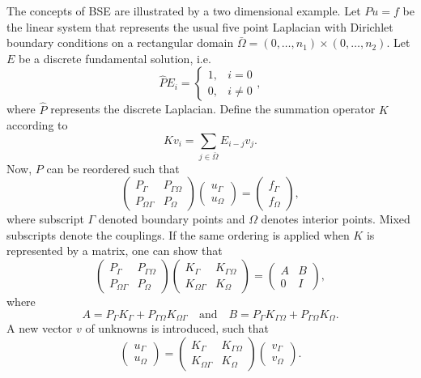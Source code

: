 \documentclass{report}
\begin{document}
The concepts of BSE are illustrated by a two dimensional example. Let
$Pu=f$ be the linear system that represents the usual five point
Laplacian with Dirichlet boundary conditions on a rectangular domain
$\bar{\Omega}=(0,\ldots,n_1)\times(0,\ldots,n_2)$. Let $E$ be a
discrete fundamental solution, i.e.
\[
\hat{P}E_i = \left\{ \begin{array}{ll}
1, &i=0\\
0, &i\ne 0 \end{array} \right. ,
\]
where $\hat{P}$ represents the discrete Laplacian. Define the
summation operator $K$ according to
\[
Kv_i=\sum_{j\in\bar{\Omega}}E_{i-j}v_j.
\]
Now, $P$ can be reordered such that
\begin{equation}
\label{eq:Puf}
\left( \begin{array}{cc} P_{\Gamma}&P_{\Gamma\Omega}\\
P_{\Omega\Gamma}&P_{\Omega} \end{array} \right)
\left( \begin{array}{c} u_{\Gamma}\\u_{\Omega} \end{array} \right)
=\left( \begin{array}{c} f_{\Gamma}\\f_{\Omega} \end{array} \right),
\end{equation}
where subscript $\Gamma$ denoted boundary points and $\Omega$ denotes
interior points. Mixed subscripts denote the couplings. If the same
ordering is applied when $K$ is represented by a matrix, one can show
that
\begin{equation}
\label{eq:KP}
\left( \begin{array}{cc} P_{\Gamma}&P_{\Gamma\Omega}\\
P_{\Omega\Gamma} & P_{\Omega} \end{array} \right)
\left( \begin{array}{cc} K_{\Gamma}&K_{\Gamma\Omega}\\
K_{\Omega\Gamma}&K_{\Omega} \end{array} \right)
=\left( \begin{array}{cc} A&B\\0&I \end{array} \right),
\end{equation}
where
\[
A=P_{\Gamma}K_{\Gamma} + P_{\Gamma\Omega}K_{\Omega\Gamma}
\quad\mbox{and}\quad
B=P_{\Gamma}K_{\Gamma\Omega}+P_{\Gamma\Omega}K_{\Omega}.
\]
A new vector $v$ of unknowns is introduced, such that
\[
\left(\begin{array}{c} u_{\Gamma}\\u_{\Omega} \end{array}\right)
=\left( \begin{array}{cc} K_{\Gamma}&K_{\Gamma\Omega}\\
K_{\Omega\Gamma}&K_{\Omega} \end{array} \right)
\left(\begin{array}{c} v_{\Gamma}\\v_{\Omega} \end{array} \right).
\]
\end{document}
